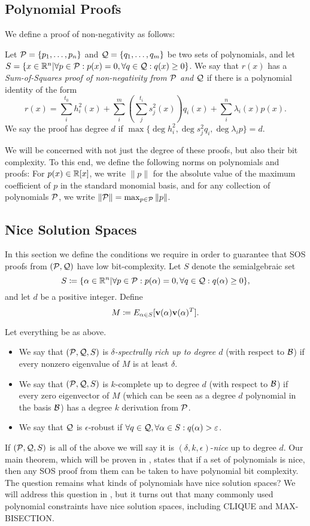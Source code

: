 \subsection{Polynomial Proofs}
We define a proof of non-negativity as follows:
\begin{definition}
Let $\mathcal P = \{p_1,\dots,p_n\}$ and $\mathcal Q = \{q_1,\dots,q_m\}$ be two sets of polynomials, and let $S = \{x \in \mathbb R^n | \forall p \in \mathcal P: p(x) = 0, \forall q \in \mathcal Q: q(x) \geq 0\}$. We say that $r(x)$ has a \emph{Sum-of-Squares proof of non-negativity from $\mathcal P$ and $\mathcal Q$} if there is a polynomial identity of the form
\[r(x) = \sum_{i}^{t_0} h_i^2(x) + \sum_{i}^m \left(\sum_{j}^{t_i} s_j^2(x)\right)q_i(x) + \sum_{i}^n \lambda_i(x) p(x).\]
We say the proof has degree $d$ if $\max \{\deg h_i^2, \deg s_j^2q_i, \deg \lambda_i p\} = d$.
\end{definition}
We will be concerned with not just the degree of these proofs, but also their bit complexity. To this end, we define the following norms on polynomials and proofs: For $p(x) \in \mathbb R[x]$, we write $\|p\|$ for the absolute value of the maximum coefficient of $p$ in the standard monomial basis, and for any collection of polynomials $\mathcal P$, we write $\|\mathcal P\| = \max_{p \in \mathcal P} \|p\|$. 

\subsection{Nice Solution Spaces}
In this section we define the conditions we require in order to guarantee that SOS proofs from $(\mathcal P, \mathcal Q)$ have low bit-complexity. Let $S$ denote the semialgebraic set
\[S \coloneqq \{\alpha \in \mathbb R^n | \forall p \in \mathcal P: p(\alpha) = 0, \forall q \in \mathcal Q: q(\alpha) \geq 0\},\]
and let $d$ be a positive integer. Define
\[M \coloneqq E_{\alpha \in S}[{\bf v}(\alpha){\bf v}(\alpha)^T].\]
\begin{definition}
Let everything be as above.
\begin{itemize}
\item We say that $(\mathcal P, \mathcal Q, S)$ is \emph{$\delta$-spectrally rich up to degree $d$} (with respect to $\mathcal B$) if every nonzero eigenvalue of $M$ is at least $\delta$.
\item We say that $(\mathcal P, \mathcal Q, S)$ is $k$-complete up to degree $d$ (with respect to $\mathcal B$) if every zero eigenvector of $M$ (which can be seen as a degree $d$ polynomial in the basis $\mathcal B$) has a degree $k$ derivation from $\mathcal P$. 
\item We say that $\mathcal Q$ is $\epsilon$-robust if $\forall q \in \mathcal Q, \forall \alpha \in S: q(\alpha) > \varepsilon$.
\end{itemize}
\end{definition}
If $(\mathcal P, \mathcal Q, S)$ is all of the above we will say it is $(\delta, k, \epsilon)$-\emph{nice} up to degree $d$. Our main theorem, which will be proven in , states that if a set of polynomials is nice, then any SOS proof from them can be taken to have polynomial bit complexity. The question remains what kinds of polynomials have nice solution spaces? We will address this question in , but it turns out that many commonly used polynomial constraints have nice solution spaces, including CLIQUE and MAX-BISECTION.

